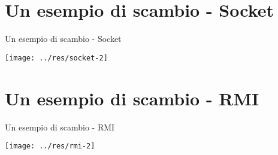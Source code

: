\documentclass[aspectratio=1610,10.5pt]{beamer} %
\begin{document}
    \section{Un esempio di scambio - Socket}\label{sec:un-esempio-di-scambio---socket}
    \begin{frame}{Un esempio di scambio - Socket}
        \begin{center}
            \texttt{[image: ../res/socket-2]}
        \end{center}
    \end{frame}


    \section{Un esempio di scambio - RMI}\label{sec:un-esempio-di-scambio---rmi}
    \begin{frame}{Un esempio di scambio - RMI}
        \begin{center}
            \texttt{[image: ../res/rmi-2]}
        \end{center}
    \end{frame}
\end{document}
